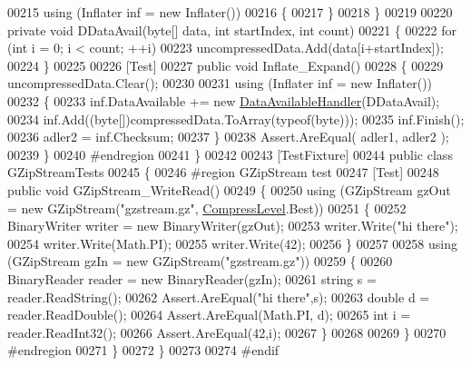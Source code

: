 \begin{DoxyCode}
00215             \textcolor{keyword}{using} (Inflater inf = \textcolor{keyword}{new} Inflater())
00216             \{
00217             \}
00218         \}
00219 
00220         \textcolor{keyword}{private} \textcolor{keywordtype}{void} DDataAvail(byte[] data, \textcolor{keywordtype}{int} startIndex, \textcolor{keywordtype}{int} count)
00221         \{
00222             \textcolor{keywordflow}{for} (\textcolor{keywordtype}{int} i = 0; i < count; ++i)
00223                 uncompressedData.Add(data[i+startIndex]);
00224         \}
00225 
00226         [Test]
00227         \textcolor{keyword}{public} \textcolor{keywordtype}{void} Inflate\_Expand()
00228         \{
00229             uncompressedData.Clear();
00230 
00231             \textcolor{keyword}{using} (Inflater inf = \textcolor{keyword}{new} Inflater())
00232             \{
00233                 inf.DataAvailable += \textcolor{keyword}{new} \hyperlink{namespace_dot_z_lib_a13a751b897fc2af0be2307e4deb7eb1c}{DataAvailableHandler}(DDataAvail);
00234                 inf.Add((byte[])compressedData.ToArray(typeof(byte)));
00235                 inf.Finish();
00236                 adler2 = inf.Checksum;
00237             \}
00238             Assert.AreEqual( adler1, adler2 );
00239         \}
00240 \textcolor{preprocessor}{        #endregion}
00241     \}
00242 
00243     [TestFixture]
00244     \textcolor{keyword}{public} \textcolor{keyword}{class }GZipStreamTests
00245     \{
00246 \textcolor{preprocessor}{        #region GZipStream test}
00247         [Test]
00248         \textcolor{keyword}{public} \textcolor{keywordtype}{void} GZipStream\_WriteRead()
00249         \{
00250             \textcolor{keyword}{using} (GZipStream gzOut = \textcolor{keyword}{new} GZipStream(\textcolor{stringliteral}{"gzstream.gz"}, 
      \hyperlink{namespace_dot_z_lib_a034f7a1ef9856d8834e6f6b1c53d8a4c}{CompressLevel}.Best))
00251             \{
00252                 BinaryWriter writer = \textcolor{keyword}{new} BinaryWriter(gzOut);
00253                 writer.Write(\textcolor{stringliteral}{"hi there"});
00254                 writer.Write(Math.PI);
00255                 writer.Write(42);
00256             \}
00257 
00258             \textcolor{keyword}{using} (GZipStream gzIn = \textcolor{keyword}{new} GZipStream(\textcolor{stringliteral}{"gzstream.gz"}))
00259             \{
00260                 BinaryReader reader = \textcolor{keyword}{new} BinaryReader(gzIn);
00261                 \textcolor{keywordtype}{string} s = reader.ReadString();
00262                 Assert.AreEqual(\textcolor{stringliteral}{"hi there"},s);
00263                 \textcolor{keywordtype}{double} d = reader.ReadDouble();
00264                 Assert.AreEqual(Math.PI, d);
00265                 \textcolor{keywordtype}{int} i = reader.ReadInt32();
00266                 Assert.AreEqual(42,i);
00267             \}
00268 
00269         \}
00270 \textcolor{preprocessor}{        #endregion}
00271     \}
00272 \}
00273 
00274 \textcolor{preprocessor}{#endif}
\end{DoxyCode}
